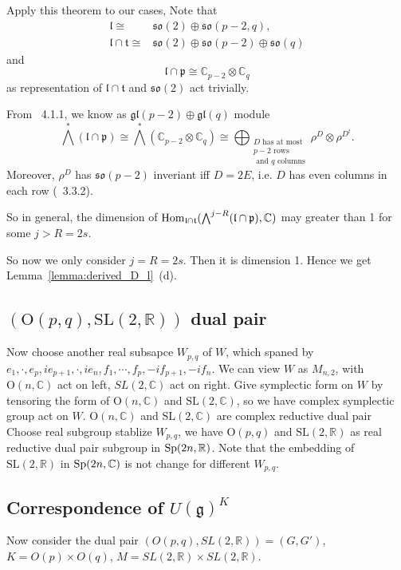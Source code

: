\documentclass[12pt]{article}
\def\Hom{{\rm Hom}}
\def\bR{{\mathbb{R}}}
\def\bC{{\mathbb{C}}}
\def\Sp{{\rm Sp}}
\def\SL{{\rm SL}}
\def\agl{\mathfrak{gl}}
\def\aso{\mathfrak{so}}
\def\fll{\mathfrak{l}}
\def\fpp{\mathfrak{p}}
\def\ftt{\mathfrak{t}}
\def\fgg{\mathfrak{g}}
\def\OO{\mathrm{O}}
\def\SL{\mathrm{SL}}
\begin{document}
Apply this theorem to our cases, 
Note that 
\begin{align*}
\fll \cong & \aso(2)\oplus\aso(p-2,q),\\
\fll\cap \ftt \cong & \aso(2)\oplus \aso(p-2)\oplus\aso(q)
\end{align*}
and 
\[
\fll \cap \fpp\cong   \bC_{p-2}\otimes \bC_{q}
\]
as representation of $\fll\cap \ftt$ and $\aso(2)$ act trivially. 


From \cite{Howe1995perspective}~4.1.1, we know as $\agl(p-2)\oplus \agl(q)$ module
\[
\bigwedge^* (\fll\cap\fpp)\cong \bigwedge^*(\bC_{p-2}\otimes \bC_{q})
\cong \bigoplus_{\substack{D\text{ has at most}\\\text{$p-2$ rows}\\\text{ and $q$ columns}}} \rho^D\otimes
\rho^{D^t}.
\]
Moreover, $\rho^D$ has $\aso(p-2)$ inveriant iff $D=2E$,
 i.e. $D$ has even columns in each row (\cite{Howe1995perspective}~3.3.2). 

So in general, the dimension of  $\Hom_{\fll\cap \ftt}(\bigwedge^{j-R}(\fll\cap \fpp),\bC)$ 
may greater than 1 for some $j>R=2s$.

So now we only consider $j=R=2s$. Then it is dimension 1.
Hence we get Lemma~\ref{lemma:derived_D_l}~(d).





\subsection{$(\OO(p,q),\SL(2,\bR))$ dual pair}
Now choose another real subsapce $W_{p,q}$ of $W$, 
which spaned by $e_1,\cdot, e_p, ie_{p+1},\cdot,ie_{n}, 
f_1, \cdots, f_p, -if_{p+1}, -if_n$. We can view $W$ as $M_{n,2}$, 
with $\OO(n,\bC)$ act on left, $SL(2,\bC)$ act on right. 
Give symplectic form on $W$ by tensoring the form 
of $\OO(n,\bC)$ and $\SL(2,\bC)$, so we have complex symplectic group act on $W$.
$\OO(n,\bC)$ and $\SL(2,\bC)$ are complex reductive dual pair 
Choose real subgroup stablize $W_{p,q}$, we have $\OO(p,q)$ and $\SL(2,\bR)$ 
as real reductive dual pair subgroup in $\Sp(2n,\bR)$. 
Note that the embedding of $\SL(2,\bR)$ in $\Sp(2n,\bC)$ is not change for
different $W_{p,q}$.



\subsection{Correspondence of $U(\fgg)^K$ }

Now consider the dual pair $(O(p,q),SL(2,\bR))=(G,G')$,
$K = O(p)\times O(q)$, $M=SL(2,\bR) \times SL(2,\bR)$.
\end{document}

